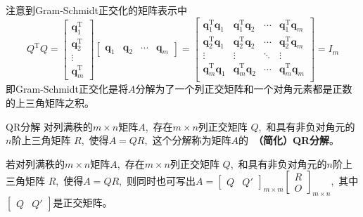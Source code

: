 \documentclass[10pt, a4paper, oneside, fontset=none]{ctexart}
\theoremstyle{plain}
\theoremstyle{definition}
\newcommand{\com}{,\,\,\,\:}
\newcommand{\de}[2][]{\begin{defil}{#1}\kai #2\end{defil}}
\newcommand{\tboba}[1]{\textbf{\kai\color{bali!75!black}#1}}
\begin{document}
注意到Gram-Schmidt正交化的矩阵表示中
$$Q^\mathrm{T}Q=\begin{bmatrix}\boldsymbol{q}_1^\mathrm{T}\\\boldsymbol{q}_2^\mathrm{T}\\\vdots\\\boldsymbol{q}_m^\mathrm{T}\end{bmatrix} \begin{bmatrix}\boldsymbol{q}_1&\boldsymbol{q}_2&\cdots&\boldsymbol{q}_m\end{bmatrix}=\begin{bmatrix}
    \boldsymbol{q}_1^\mathrm{T}\boldsymbol{q}_1&\boldsymbol{q}_1^\mathrm{T}\boldsymbol{q}_2&\cdots&\boldsymbol{q}_1^\mathrm{T}\boldsymbol{q}_m\\
    \boldsymbol{q}_2^\mathrm{T}\boldsymbol{q}_1&\boldsymbol{q}_2^\mathrm{T}\boldsymbol{q}_2&\cdots&\boldsymbol{q}_2^\mathrm{T}\boldsymbol{q}_m\\
    \vdots&\vdots&\ddots&\vdots\\
    \boldsymbol{q}_m^\mathrm{T}\boldsymbol{q}_1&\boldsymbol{q}_m^\mathrm{T}\boldsymbol{q}_2&\cdots&\boldsymbol{q}_m^\mathrm{T}\boldsymbol{q}_m\\
\end{bmatrix}=I_m$$
即Gram-Schmidt正交化是将$A$分解为了一个列正交矩阵和一个对角元素都是正数的上三角矩阵之积。
\de[QR分解]{
    对列满秩的$m \times n$矩阵$A$\com 存在$m \times n$列正交矩阵 $Q$\com 和具有非负对角元的$n$阶上三角矩阵 $R$\com 使得$A=QR$\com 这个分解称为矩阵$A$的~\tboba{（简化）\textup{QR}分解}。
}
若对列满秩的$m \times n$矩阵$A$\com 存在$m \times n$列正交矩阵 $Q$\com 和具有非负对角元的$n$阶上三角矩阵 $R$\com 使得$A=QR$\com 则同时也可写出$A=\begin{bmatrix}
    Q & Q'
\end{bmatrix}_{m \times m}\begin{bmatrix}
    R \\ O
\end{bmatrix}_{m \times n}$\com 其中$\begin{bmatrix}
    Q & Q'
\end{bmatrix}$是正交矩阵。
\end{document}
